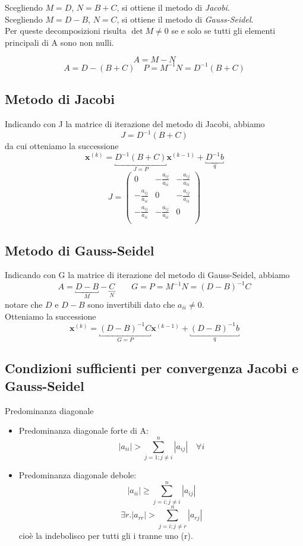 Scegliendo $M = D$, $N = B + C$, si ottiene il metodo di \emph{Jacobi}.\\
Scegliendo $M = D − B$, $N = C$, si ottiene il metodo di \emph{Gauss-Seidel}.\\
Per queste decomposizioni risulta $\det M \neq 0$ se e solo se tutti gli
elementi principali di A sono non nulli.



$$ A = M -N $$ 
$$ A = D - (B+C) \quad  P = M^{-1}N = D^{-1}(B+C)$$

\subsection{Metodo di Jacobi}
Indicando con J la matrice di iterazione del metodo di Jacobi, abbiamo
$$ J = D^{-1} (B+C) $$
da cui otteniamo la successione
$$ \mathbf{x}^{(k)} = \underbracket{D^{-1} (B+C)}_{J=P} \mathbf{x}^{(k-1)} + \underbracket{D^{-1}b}_{q} $$
$$ J = 
\begin{pmatrix}
0                      & -\frac{a_{ij}}{a_{ii}} & -\frac{a_{ij}}{a_{ii}} \\
-\frac{a_{ij}}{a_{ii}} & 0                      & -\frac{a_{ij}}{a_{ii}} \\
-\frac{a_{ij}}{a_{ii}} & -\frac{a_{ij}}{a_{ii}} & 0                      \\
\end{pmatrix} $$

\subsection{Metodo di Gauss-Seidel}
Indicando con G la matrice di iterazione del metodo di Gauss-Seidel,
abbiamo
$$A = \underbracket{D-B}_{M} - \underbracket{C}_{N} \qquad G = P = M^{-1}N = (D-B)^{-1}C$$
notare che $D$ e $D - B$ sono invertibili dato che $a_{ii} \neq 0$.\\
Otteniamo la successione
$$ \mathbf{x}^{(k)} = \underbracket{(D-B)^{-1}C}_{G=P} \mathbf{x}^{(k-1)} + \underbracket{(D-B)^{-1} b}_{q}$$

\subsection{Condizioni sufficienti per convergenza Jacobi e Gauss-Seidel}
Predominanza diagonale
\begin{itemize}
 \item Predominanza diagonale forte di A: 
   $$ |a_{ii}| > \displaystyle \sum_{j=1; j \neq i}^{n} |a_{ij}| \quad
   \forall i $$ 
 \item Predominanza diagonale debole: 
   $$ |a_{ii}| \geq \displaystyle \sum_{j=i; j \neq i}^{n} |a_{ij}|$$ 
   $$ \exists r . |a_{rr}| > \displaystyle \sum_{j=i; j \neq r}^{n} | a_{rj}| $$ 
   cio\`e la indebolisco per tutti gli i tranne uno (r).
\end{itemize}

